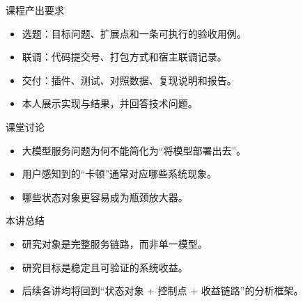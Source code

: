 \begin{frame}{课程产出要求}
  \begin{itemize}
    \item 选题：目标问题、扩展点和一条可执行的验收用例。
    \item 联调：代码提交号、打包方式和宿主联调记录。
    \item 交付：插件、测试、对照数据、复现说明和报告。
    \item 本人展示实现与结果，并回答技术问题。
  \end{itemize}
\end{frame}



\begin{frame}{课堂讨论}
  \begin{itemize}
    \item 大模型服务问题为何不能简化为“将模型部署出去”。
    \item 用户感知到的“卡顿”通常对应哪些系统现象。
    \item 哪些状态对象更容易成为瓶颈放大器。
  \end{itemize}
\end{frame}

\begin{frame}{本讲总结}
  \begin{itemize}
    \item 研究对象是完整服务链路，而非单一模型。
    \item 研究目标是稳定且可验证的系统收益。
    \item 后续各讲均将回到“状态对象 + 控制点 + 收益链路”的分析框架。
  \end{itemize}
\end{frame}

\LectureOneSources


